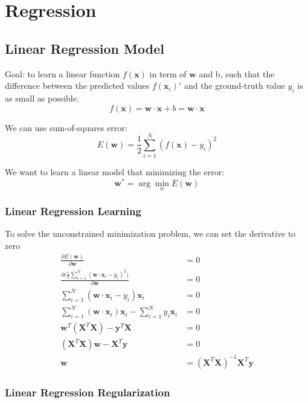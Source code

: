 \chapter{Regression}

\begin{multicols}{2}
\section{Linear Regression Model}

\noindent Goal: to learn a linear function $f(\mathbf{x})$ in term of $\mathbf{w}$ and b, such that the difference between the predicted values $f(\mathbf{x}_i)'$ and the ground-truth value $y_i$ is as small as possible. 
$$f(\mathbf{x}) = \mathbf{w} \cdot \mathbf{x} + b = \mathbf{w} \cdot \mathbf{x}$$

\noindent We can use sum-of-squares error:
$$E(\mathbf{w}) = \frac{1}{2} \sum_{i=1}^N ( f(\mathbf{x}) - y_i )^2$$

\noindent We want to learn a linear model that minimizing the error:
$$\mathbf{w}^* = \arg\!\min_w E(\mathbf{w})$$

\subsection{Linear Regression Learning}
\noindent To solve the unconstrained minimization problem, we can set the derivative to zero
\begin{equation*}
\begin{split}
    \frac{\partial E(\mathbf{w})}{\partial \mathbf{w}} &= 0\\
    \frac{\partial \Big(\frac{1}{2} \sum_{i=1}^N (\mathbf{w} \cdot \mathbf{x}_i - y_i)^2\Big)}{\partial \mathbf{w}} &= 0 \\
    \sum_{i=1}^N (\mathbf{w} \cdot \mathbf{x}_i - y_i)\mathbf{x}_i &= 0 \\
    \sum_{i=1}^N (\mathbf{w} \cdot \mathbf{x}_i)\mathbf{x}_i - \sum_{i=1}^N y_i \mathbf{x}_i &= 0 \\
    \mathbf{w}^T(\mathbf{X}^T \mathbf{X}) - \mathbf{y}^T \mathbf{X} &= 0 \\
    (\mathbf{X}^T \mathbf{X}) \mathbf{w} - \mathbf{X}^T \mathbf{y} &= 0 \\
    \mathbf{w} &= (\mathbf{X}^T \mathbf{X})^{-1} \mathbf{X}^T \mathbf{y}
\end{split}
\end{equation*}

\subsection{Linear Regression Regularization}


\end{multicols}

